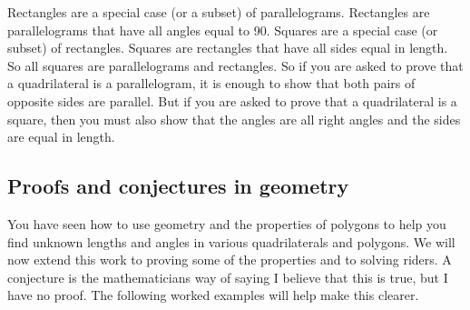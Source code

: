 Rectangles are a special case (or a subset) of parallelograms. Rectangles are parallelograms that have all angles equal to 90. Squares are a special case (or subset) of rectangles. Squares are rectangles that have all sides equal in length. So all squares are parallelograms and rectangles. So if you are asked to prove that a quadrilateral is a parallelogram, it is enough to show that both pairs of opposite sides are parallel. But if you are asked to prove that a quadrilateral is a square, then you must also show that the angles are all right angles and the sides are equal in length.
\par 

%     

\subsection{ Proofs and conjectures in geometry}

You have seen how to use geometry and the properties of polygons to help you find unknown lengths and angles in various quadrilaterals and polygons. We will now extend this work to proving some of the properties and to solving riders. A conjecture is the mathematicians way of saying I believe that this is true, but I have no proof. The following worked examples will help make this clearer. 
\par 

